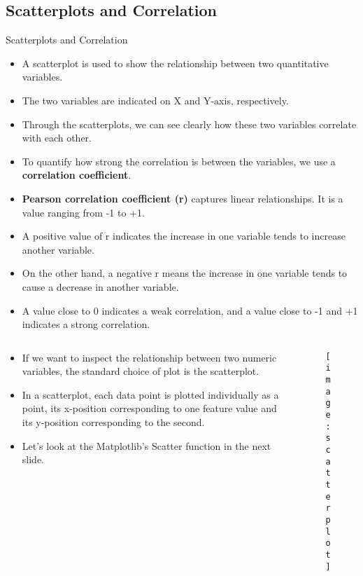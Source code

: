 \documentclass[12pt]{beamer}
\begin{document}
    \subsection{Scatterplots and Correlation}
    \begin{frame}{Scatterplots and Correlation}
    	\begin{itemize}
    		\item A scatterplot is used to show the relationship between two quantitative variables. 
    		\item The two variables are indicated on X and Y-axis, respectively. 
    		\item Through the scatterplots, we can see clearly how these two variables correlate with each other.
    		\item To quantify how strong the correlation is between the variables, we use a \textbf{correlation coefficient}.
    		\item \textbf{Pearson correlation coefficient (r)} captures linear relationships. It is a value ranging from -1 to +1.
    		\item A positive value of r indicates the increase in one variable tends to increase another variable. 
    		\item On the other hand, a negative r means the increase in one variable tends to cause a decrease in another variable.
    		\item A value close to 0 indicates a weak correlation, and a value close to -1 and +1 indicates a strong correlation.
    	\end{itemize}
    \end{frame}
    \begin{frame}{}
    	\begin{columns}
    		\begin{column}{0.6\textwidth}
    			\begin{itemize}
    				\item If we want to inspect the relationship between two numeric variables, the standard choice of plot is the scatterplot.
    				\item In a scatterplot, each data point is plotted individually as a point, its x-position corresponding to one feature value and its y-position corresponding to the second.
    				\item Let's look at the Matplotlib's Scatter function in the next slide.
    			\end{itemize}
    		\end{column}
    	\begin{column}{0.6\textwidth}
    		\begin{figure}
    			\centering
    			\texttt{[image: scatterplot]}
    		\end{figure}
    	\end{column}
    	\end{columns}
    \end{frame}
\end{document}
